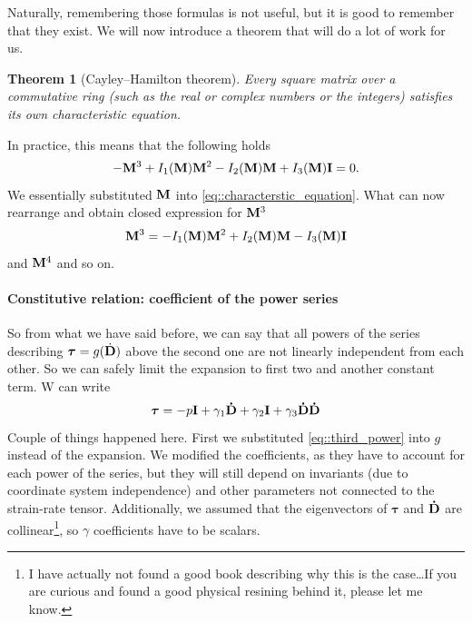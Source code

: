 \documentclass[a4paper]{article}
\newtheorem{theorem}{Theorem}
\begin{document}
Naturally, remembering those formulas is not useful, but it is good to
remember that they exist. We will now introduce a theorem that will do
a lot of work for us.
\begin{theorem}[Cayley–Hamilton theorem]
	Every square matrix over a commutative ring (such as the real or
	complex numbers or the integers) satisfies its own characteristic equation.
\end{theorem}
\noindent
In practice, this means that the following holds
\begin{equation*}
	-\vb{M}^3 + I_1 \qty(\vb{M})\vb{M}^2 - I_2\qty(\vb{M})\vb{M}
	+ I_3\qty(\vb{M})\vb{I} = 0.
\end{equation*}
We essentially substituted \(\vb{M}\) into \autoref{eq::characterstic_equation}.
What can now rearrange and obtain closed expression for \(\vb{M}^3\)
\begin{equation}\label{eq::third_power}
	\vb{M}^3  = - I_1 \qty(\vb{M})\vb{M}^2 + I_2\qty(\vb{M})\vb{M}
	- I_3\qty(\vb{M})\vb{I}
\end{equation}
and \(\vb{M}^4\) and so on.

\paragraph{Constitutive relation: coefficient of the power series}
So from what we have said before, we can say that all powers of the
series describing \(\bm{\tau} = g(\dot{\vb{D}})\) above the second one
are not linearly independent from each other. So we can safely limit the
expansion to first two and another constant term. W can write
\[
	\bm{\tau} = -p\vb{I} + \gamma_1 \vb{\dot{D}} + \gamma_2\vb{I}
	+ \gamma_3\vb{\dot{D}}\vb{\dot{D}}
\]
Couple of things happened here. First we substituted \autoref{eq::third_power}
into \(g\) instead of the expansion. We modified the coefficients, as they have
to account for each power of the series, but they will still depend on
invariants (due to coordinate system independence) and other parameters not
connected to the strain-rate tensor. Additionally, we assumed that the
eigenvectors of \(\bm{\tau}\) and \(\vb{\dot{D}}\) are collinear\footnote{%
	I have actually not found a good book describing why this is the case\dots If
	you are curious and found a good physical resining behind it, please let me
	know.}, so \(\gamma\) coefficients have to be scalars.
\end{document}
